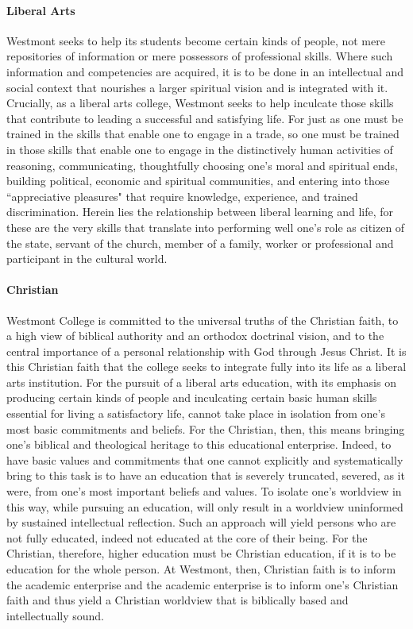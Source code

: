 			\paragraph {Liberal Arts}
				 Westmont seeks to help its students become certain kinds of people, not mere
				repositories of information or mere possessors of professional skills.  Where such information and
				competencies are acquired, it is to be done in an intellectual and social context that nourishes a
				larger spiritual vision and is integrated with it.  Crucially, as a liberal arts college, Westmont seeks
				to help inculcate those skills that contribute to leading a successful and satisfying life.  For just as
				one must be trained in the skills that enable one to engage in a trade, so one must be trained in those
				skills that enable one to engage in the distinctively human activities of reasoning, communicating,
				thoughtfully choosing one's moral and spiritual ends, building political, economic and spiritual
				communities, and entering into those ``appreciative pleasures" that require knowledge, experience, and
				trained discrimination. Herein lies the relationship between liberal learning and life, for these are
				the very skills that translate into performing well one's role as citizen of the state, servant of the
				church, member of a family, worker or professional and participant in the cultural world.
			\paragraph{Christian}
				Westmont College is committed to the universal truths of the Christian faith, to a high view of biblical
				authority and an orthodox doctrinal vision, and to the central importance of a personal relationship
				with God through Jesus Christ.  It is this Christian faith that the college seeks to integrate fully
				into its life as a liberal arts institution.  For the pursuit of a liberal arts education, with its
				emphasis on producing certain kinds of people and inculcating certain basic human skills essential for
				living a satisfactory life, cannot take place in isolation from one's most basic commitments and
				beliefs.  For the Christian, then, this means bringing one's biblical and theological heritage to this
				educational enterprise. Indeed, to have basic values and commitments that one cannot explicitly and
				systematically bring to this task is to have an education that is severely truncated, severed, as it
				were, from one's most important beliefs and values.  To isolate one's worldview in this way, while
				pursuing an education, will only result in a worldview uninformed by sustained intellectual reflection.
				Such an approach will yield persons who are not fully educated, indeed not educated at the core of their
				being.  For the Christian, therefore, higher education must be Christian education, if it is to be
				education for the whole person.  At Westmont, then, Christian faith is to inform the academic enterprise
				and the academic enterprise is to inform one's Christian faith and thus yield a Christian worldview that
				is biblically based and intellectually sound.
